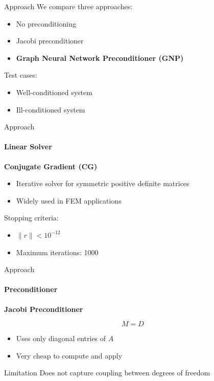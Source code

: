 \documentclass[aspectratio=169]{beamer}
\begin{document}
\begin{frame}{Approach}
	We compare three approaches:
	
	\begin{itemize}
		\item No preconditioning
		\item Jacobi preconditioner
		\item \textbf{Graph Neural Network Preconditioner (GNP)}
	\end{itemize}
	
	\medskip
	
	Test cases:
	
	\begin{itemize}
		\item Well-conditioned system
		\item Ill-conditioned system
	\end{itemize}
	
	\medskip
	
\end{frame}



\begin{frame}{Approach}
	 \framesubtitle{Linear Solver}
	
	\textbf{Conjugate Gradient (CG)}
	
	\medskip
	
	\begin{itemize}
		\item Iterative solver for symmetric positive definite matrices
		\item Widely used in FEM applications
	\end{itemize}
	
	\medskip
	
	Stopping criteria:

	\medskip
	
	\begin{itemize}
		\item $\|r\| < 10^{-12}$
		\item Maximum iterations: 1000
	\end{itemize}
	

\end{frame}


\begin{frame}{Approach}
	\framesubtitle{Preconditioner}
	\textbf{Jacobi Preconditioner}
	
	
	\[
	M = D
	\]
	
	\medskip
	
	\begin{itemize}
		\item Uses only diagonal entries of $A$
		\item Very cheap to compute and apply
	\end{itemize}
	
	\medskip
	
	\begin{block}{Limitation}
		Does not capture coupling between degrees of freedom
	\end{block}
	
\end{frame}
\end{document}
